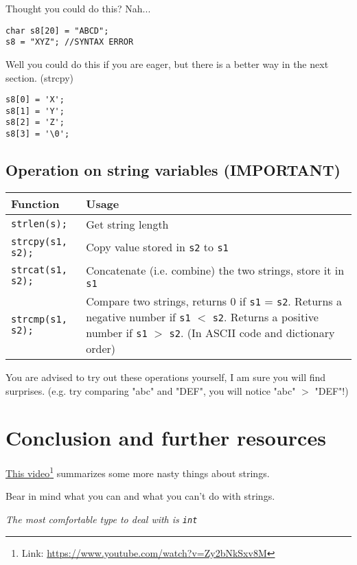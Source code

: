 Thought you could do this? Nah...

\begin{lstlisting}
char s8[20] = "ABCD";
s8 = "XYZ"; //SYNTAX ERROR
\end{lstlisting}

Well you could do this if you are eager, but there is a better way in the next section. (strcpy)

\begin{lstlisting}
s8[0] = 'X'; 
s8[1] = 'Y'; 
s8[2] = 'Z'; 
s8[3] = '\0'; 
\end{lstlisting}


\subsection{Operation on string variables (IMPORTANT)}

\begin{table}[h]
    \centering
    \begin{tabular}{|m{10em}|m{25em}|}
        \hline
        \textbf{Function} & 
        Usage 
        \\ \hline \hline
        
        \texttt{strlen(s);} &
        Get string length
        \\ \hline
        
        \texttt{strcpy(s1, s2);} &
        Copy value stored in \texttt{s2} to \texttt{s1} 
        \\ \hline
        
        \texttt{strcat(s1, s2);} &
        Concatenate (i.e. combine) the two strings, store it in \texttt{s1} 
        \\ \hline
        
        \texttt{strcmp(s1, s2);} &
        Compare two strings, returns 0 if \texttt{s1} = \texttt{s2}. Returns a negative number if \texttt{s1} $<$ \texttt{s2}. Returns a positive number if \texttt{s1} $>$ \texttt{s2}. (In ASCII code and dictionary order)
        \\ \hline
    \end{tabular}
\end{table}

You are advised to try out these operations yourself, I am sure you will find surprises. (e.g. try comparing "abc" and "DEF", you will notice "abc" $>$ "DEF"!)

\section{Conclusion and further resources}

\href{https://www.youtube.com/watch?v=Zy2bNkSxv8M}{This video}\footnote{Link: \href{https://www.youtube.com/watch?v=Zy2bNkSxv8M}{https://www.youtube.com/watch?v=Zy2bNkSxv8M}} summarizes some more nasty things about strings.

Bear in mind what you can and what you can't do with strings.
\vspace{6mm}

\begin{center}
\textit{The most comfortable type to deal with is \texttt{int}}
\end{center}

